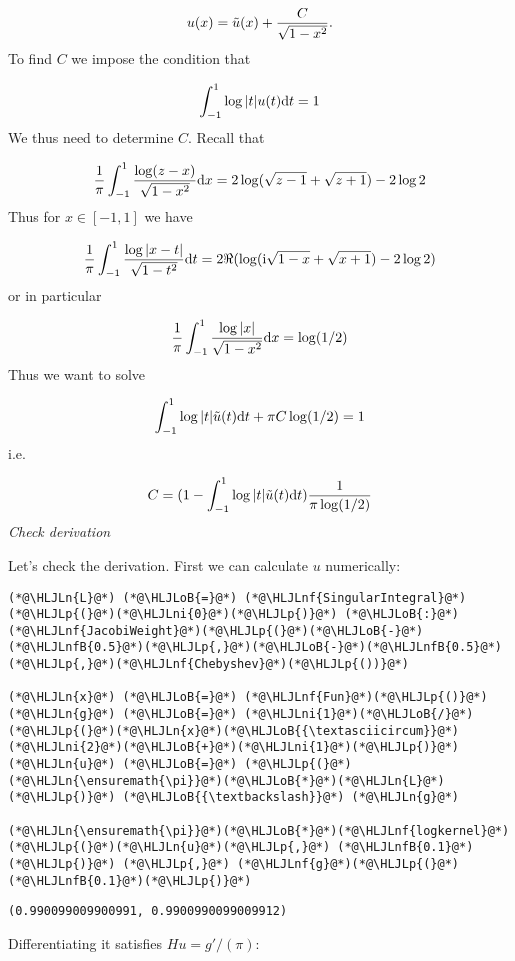 \documentclass[12pt,a4paper]{article}
\newcommand{\HLJLn}[1]{#1}
\newcommand{\HLJLnf}[1]{\textcolor[RGB]{66,102,213}{#1}}
\newcommand{\HLJLnfB}[1]{\textcolor[RGB]{59,151,46}{#1}}
\newcommand{\HLJLni}[1]{\textcolor[RGB]{59,151,46}{#1}}
\newcommand{\HLJLoB}[1]{\textcolor[RGB]{102,102,102}{\textbf{#1}}}
\newcommand{\HLJLp}[1]{#1}
\def\D{ {\rm d} }
\def\I{ {\rm i} }
\def\dx{\D x}
\def\dt{\D t}
\begin{document}
\[
u(x) =  \tilde u(x) + {C \over \sqrt{1-x^2}}.
\]
To find $C$ we impose the condition that

\[
\int_{-1}^1 \log|t| u(t) \dt = 1
\]
We thus need to determine $C$. Recall that

\[
{1 \over \pi} \int_{-1}^1 {\log(z-x) \over \sqrt{1-x^2}} \dx = 2 \log(\sqrt{z-1}+\sqrt{z+1}) - 2 \log 2
\]
Thus for $x \in [-1,1]$ we have

\[
{1 \over \pi} \int_{-1}^1 {\log|x-t| \over \sqrt{1-t^2}} \dt = 2 \Re(\log(\I \sqrt{1-x}+\sqrt{x+1}) - 2 \log 2)
\]
or in particular

\[
{1 \over \pi} \int_{-1}^1 {\log|x| \over \sqrt{1-x^2}} \dx = \log(1/2)
\]
Thus we want to solve

\[
\int_{-1}^1 \log|t| \tilde u(t) \dt + \pi C \log(1/2)  = 1
\]
i.e.

\[
C = (1 - \int_{-1}^1 \log|t| \tilde u(t) \dt)  {1 \over  \pi \log(1/2)}
\]
\emph{Check derivation}

Let's check the derivation. First we can calculate $u$ numerically:


\begin{lstlisting}
(*@\HLJLn{L}@*) (*@\HLJLoB{=}@*) (*@\HLJLnf{SingularIntegral}@*)(*@\HLJLp{(}@*)(*@\HLJLni{0}@*)(*@\HLJLp{)}@*) (*@\HLJLoB{:}@*) (*@\HLJLnf{JacobiWeight}@*)(*@\HLJLp{(}@*)(*@\HLJLoB{-}@*)(*@\HLJLnfB{0.5}@*)(*@\HLJLp{,}@*)(*@\HLJLoB{-}@*)(*@\HLJLnfB{0.5}@*)(*@\HLJLp{,}@*)(*@\HLJLnf{Chebyshev}@*)(*@\HLJLp{())}@*)

(*@\HLJLn{x}@*) (*@\HLJLoB{=}@*) (*@\HLJLnf{Fun}@*)(*@\HLJLp{()}@*)
(*@\HLJLn{g}@*) (*@\HLJLoB{=}@*) (*@\HLJLni{1}@*)(*@\HLJLoB{/}@*)(*@\HLJLp{(}@*)(*@\HLJLn{x}@*)(*@\HLJLoB{{\textasciicircum}}@*)(*@\HLJLni{2}@*)(*@\HLJLoB{+}@*)(*@\HLJLni{1}@*)(*@\HLJLp{)}@*)
(*@\HLJLn{u}@*) (*@\HLJLoB{=}@*) (*@\HLJLp{(}@*)(*@\HLJLn{\ensuremath{\pi}}@*)(*@\HLJLoB{*}@*)(*@\HLJLn{L}@*)(*@\HLJLp{)}@*) (*@\HLJLoB{{\textbackslash}}@*) (*@\HLJLn{g}@*)

(*@\HLJLn{\ensuremath{\pi}}@*)(*@\HLJLoB{*}@*)(*@\HLJLnf{logkernel}@*)(*@\HLJLp{(}@*)(*@\HLJLn{u}@*)(*@\HLJLp{,}@*) (*@\HLJLnfB{0.1}@*)(*@\HLJLp{)}@*) (*@\HLJLp{,}@*) (*@\HLJLnf{g}@*)(*@\HLJLp{(}@*)(*@\HLJLnfB{0.1}@*)(*@\HLJLp{)}@*)
\end{lstlisting}

\begin{lstlisting}
(0.990099009900991, 0.9900990099009912)
\end{lstlisting}


Differentiating it satisfies $H u = g'/(\pi)$:
\end{document}
